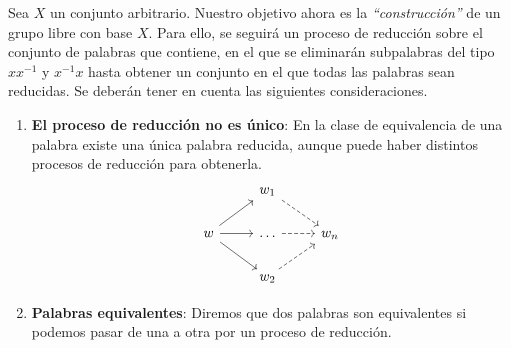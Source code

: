 


Sea $X$ un conjunto arbitrario. Nuestro objetivo ahora es la \textit{``construcción''} de un grupo libre con base $X$. Para ello, se seguirá un proceso de reducción sobre el conjunto de palabras que contiene, en el que se eliminarán subpalabras del tipo $xx^{-1}$ y $x^{-1}x$ hasta obtener un conjunto en el que todas las palabras sean reducidas. Se deberán tener en cuenta las siguientes consideraciones.
\begin{enumerate}
    \item \textbf{El proceso de reducción no es único}: En la clase de equivalencia de una palabra existe una única palabra reducida, aunque puede haber distintos procesos de reducción para obtenerla.
    \[
    \begin{tikzcd}
    & w_1 \arrow[dr,dashrightarrow]{} \\
    w \arrow[r] \arrow[ur] \arrow[dr]  & \ldots \arrow[r,dashrightarrow] & w_n \\
    & w_2 \arrow[ur,dashrightarrow]{}
    \end{tikzcd}
    \]
    \item \textbf{Palabras equivalentes}: Diremos que dos palabras son equivalentes si podemos pasar de una a otra por un proceso de reducción.
\end{enumerate}







